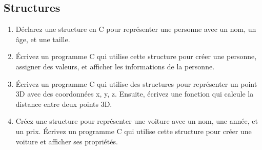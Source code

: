 \subsection{Structures}
\begin{enumerate}
	\item Déclarez une structure en C pour représenter une personne avec un nom, un âge, et une taille.
	\item Écrivez un programme C qui utilise cette structure pour créer une personne, assigner des valeurs, et afficher les informations de la personne.
		
		
			
			
	
	\item Écrivez un programme C qui utilise des structures pour représenter un point 3D avec des coordonnées x, y, z. Ensuite, écrivez une fonction qui calcule la distance entre deux points 3D.
		
		
		
			
			
			
	
	\item Créez une structure pour représenter une voiture avec un nom, une année, et un prix. Écrivez un programme C qui utilise cette structure pour créer une voiture et afficher ses propriétés.
		

\end{enumerate}

